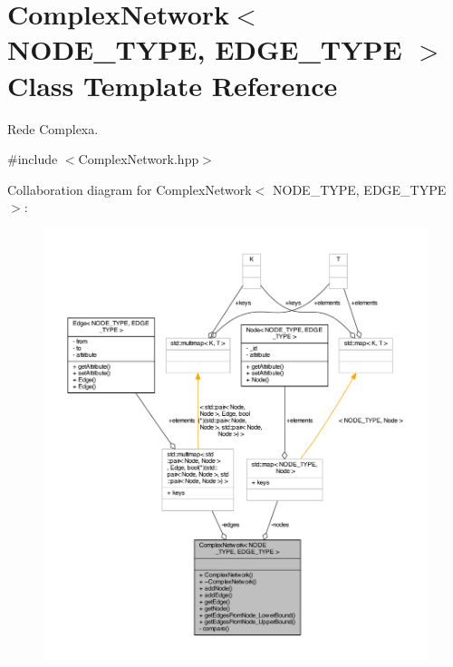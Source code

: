 \hypertarget{class_complex_network}{\section{Complex\+Network$<$ N\+O\+D\+E\+\_\+\+T\+Y\+P\+E, E\+D\+G\+E\+\_\+\+T\+Y\+P\+E $>$ Class Template Reference}
\label{class_complex_network}
}


Rede Complexa.  




{\ttfamily \#include $<$Complex\+Network.\+hpp$>$}



Collaboration diagram for Complex\+Network$<$ N\+O\+D\+E\+\_\+\+T\+Y\+P\+E, E\+D\+G\+E\+\_\+\+T\+Y\+P\+E $>$\+:
\nopagebreak
\begin{figure}[H]
\begin{center}
\leavevmode
\includegraphics[width=350pt]{class_complex_network__coll__graph}
\end{center}
\end{figure}
